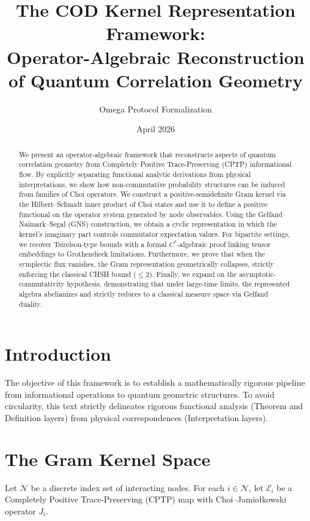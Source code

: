 \documentclass[11pt, a4paper]{article}
\title{The COD Kernel Representation Framework: \\ Operator-Algebraic Reconstruction of Quantum Correlation Geometry}
\author{Omega Protocol Formalization}
\date{April 2026}
\begin{document}
\maketitle

\begin{abstract}
We present an operator-algebraic framework that reconstructs aspects of quantum correlation geometry from Completely Positive Trace-Preserving (CPTP) informational flow. By explicitly separating functional analytic derivations from physical interpretations, we show how non-commutative probability structures can be induced from families of Choi operators. We construct a positive-semidefinite Gram kernel via the Hilbert--Schmidt inner product of Choi states and use it to define a positive functional on the operator system generated by node observables. Using the Gelfand--Naimark--Segal (GNS) construction, we obtain a cyclic representation in which the kernel's imaginary part controls commutator expectation values. For bipartite settings, we recover Tsirelson-type bounds with a formal $C^*$-algebraic proof linking tensor embeddings to Grothendieck limitations. Furthermore, we prove that when the symplectic flux vanishes, the Gram representation geometrically collapses, strictly enforcing the classical CHSH bound ($\le 2$). Finally, we expand on the asymptotic-commutativity hypothesis, demonstrating that under large-time limits, the represented algebra abelianizes and strictly reduces to a classical measure space via Gelfand duality.
\end{abstract}

\section{Introduction}

The objective of this framework is to establish a mathematically rigorous pipeline from informational operations to quantum geometric structures. To avoid circularity, this text strictly delineates rigorous functional analysis (Theorem and Definition layers) from physical correspondences (Interpretation layers).

\section{The Gram Kernel Space}

Let $\mathcal{N}$ be a discrete index set of interacting nodes. For each $i \in \mathcal{N}$, let $\mathcal{E}_i$ be a Completely Positive Trace-Preserving (CPTP) map with Choi--Jamio\l{}kowski operator $J_i$.
\end{document}
